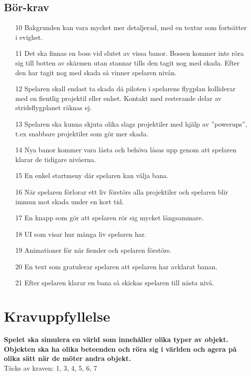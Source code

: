 \documentclass{TDP005mall}
\begin{document}
\subsection{Bör-krav}
\begin{enumerate}
  \setcounter{enumi}{13}
  \item [10] Bakgrunden kan vara mycket mer detaljerad, med en textur som fortsätter i evighet.
  \item [11] Det ska finnas en boss vid slutet av vissa banor.
             Bossen kommer inte röra sig till botten av skärmen utan stannar tills den tagit nog med skada.
             Efter den har tagit nog med skada så vinner spelaren nivån.
  \item [12] Spelaren skall endast ta skada då piloten i spelarens flygplan kolliderar med en fientlig projektil eller enhet. Kontakt med resterande delar av stridsflygplanet räknas ej. 
  \item [13] Spelaren ska kunna skjuta olika slags projektiler med hjälp av ''powerups'', t.ex snabbare projektiler som gör mer skada.
  \item [14] Nya banor kommer vara låsta och behöva låsas upp genom att spelaren klarar de tidigare nivåerna. 
  \item [15] En enkel startmeny där spelaren kan välja bana.
  \item [16] När spelaren förlorar ett liv förstörs alla projektiler och spelaren blir immun mot skada under en kort tid.
  \item [17] En knapp som gör att spelaren rör sig mycket långsammare.
  \item [18] UI som visar hur många liv spelaren har.
  \item [19] Animationer för när fiender och spelaren förstörs.
  \item [20] En text som gratulerar spelaren att spelaren har avklarat banan.
  \item [21] Efter spelaren klarar en bana så skickas spelaren till nästa nivå.
\end{enumerate}
\section{Kravuppfyllelse}
\textbf{Spelet ska simulera en värld som innehåller olika typer av objekt. Objekten ska ha olika beteenden och röra sig i världen och agera på olika sätt när de möter andra objekt.}
\\
Täcks av kraven: 1, 3, 4, 5, 6, 7
\end{document}
